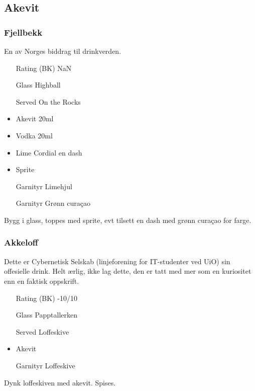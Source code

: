 \subsection{Akevit}
\subsubsection{Fjellbekk}
En av Norges biddrag til drinkverden. 
\begin{itemize}
    \item[Rating (BK)] NaN
    \item[Glass] Highball
    \item[Served] On the Rocks
    \item Akevit 20ml
    \item Vodka 20ml
    \item Lime Cordial en dash
    \item Sprite
    \item[Garnityr] Limehjul
    \item[Garnityr] Grønn curaçao
\end{itemize}
Bygg i glass, toppes med sprite, evt tilsett en dash med grønn curaçao for farge.

\subsubsection{Akkeloff}
Dette er Cybernetisk Selskab (linjeforening for IT-studenter ved UiO) sin offesielle drink. Helt ærlig, ikke lag dette, den er tatt med mer som en kuriositet enn en faktisk oppskrift.
\begin{itemize}
    \item[Rating (BK)] -10/10
    \item[Glass] Papptallerken
    \item[Served] Loffeskive
    \item Akevit
    \item[Garnityr] Loffeskive
\end{itemize}
Dynk loffeskiven med akevit. Spises.